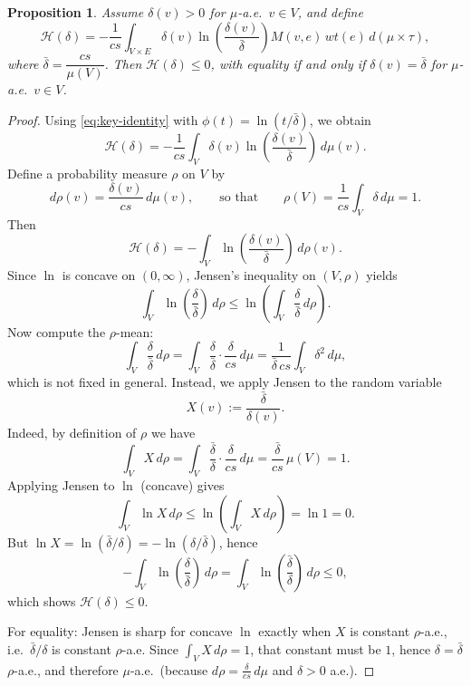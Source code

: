 \documentclass[10pt,a4paper]{amsart}
\newtheorem{prop}{Proposition}
\begin{document}
\begin{prop}
\label{cor:entropy-proof}
Assume $\delta(v)>0$ for $\mu$-a.e.\ $v\in V$, and define
\[
\mathcal{H}(\delta)
=
-\frac{1}{cs}
\int_{V\times E}
\delta(v)\ln\!\left(\frac{\delta(v)}{\bar\delta}\right)
M(v,e)\,wt(e)\,d(\mu\times\tau),
\]
where $\bar\delta=\dfrac{cs}{\mu(V)}$.
Then $\mathcal{H}(\delta)\le 0$, with equality if and only if
$\delta(v)=\bar\delta$ for $\mu$-a.e.\ $v\in V$.
\end{prop}

\begin{proof}
Using \eqref{eq:key-identity} with $\phi(t)=\ln(t/\bar\delta)$, we obtain
\[
\mathcal{H}(\delta)
=
-\frac{1}{cs}\int_V \delta(v)\ln\!\left(\frac{\delta(v)}{\bar\delta}\right)\,d\mu(v).
\]
Define a probability measure $\rho$ on $V$ by
\[
d\rho(v)=\frac{\delta(v)}{cs}\,d\mu(v),
\qquad\text{so that}\qquad
\rho(V)=\frac{1}{cs}\int_V \delta\,d\mu=1.
\]
Then
\[
\mathcal{H}(\delta)
=
-\int_V \ln\!\left(\frac{\delta(v)}{\bar\delta}\right)\,d\rho(v).
\]
Since $\ln$ is concave on $(0,\infty)$, Jensen's inequality on $(V,\rho)$ yields
\[
\int_V \ln\!\left(\frac{\delta}{\bar\delta}\right)\,d\rho
\le
\ln\!\left(\int_V \frac{\delta}{\bar\delta}\,d\rho\right).
\]
Now compute the $\rho$-mean:
\[
\int_V \frac{\delta}{\bar\delta}\,d\rho
=
\int_V \frac{\delta}{\bar\delta}\cdot\frac{\delta}{cs}\,d\mu
=
\frac{1}{\bar\delta\,cs}\int_V \delta^2\,d\mu,
\]
which is not fixed in general.  Instead, we apply Jensen to the random variable
\[
X(v):=\frac{\bar\delta}{\delta(v)}.
\]
Indeed, by definition of $\rho$ we have
\[
\int_V X\,d\rho
=
\int_V \frac{\bar\delta}{\delta}\cdot\frac{\delta}{cs}\,d\mu
=
\frac{\bar\delta}{cs}\,\mu(V)
=
1.
\]
Applying Jensen to $\ln$ (concave) gives
\[
\int_V \ln X\,d\rho
\le \ln\!\left(\int_V X\,d\rho\right)=\ln 1=0.
\]
But $\ln X=\ln(\bar\delta/\delta)=-\ln(\delta/\bar\delta)$, hence
\[
-\int_V \ln\!\left(\frac{\delta}{\bar\delta}\right)\,d\rho
=
\int_V \ln\!\left(\frac{\bar\delta}{\delta}\right)\,d\rho
\le 0,
\]
which shows $\mathcal{H}(\delta)\le 0$.

For equality: Jensen is sharp for concave $\ln$ exactly when $X$ is constant
$\rho$-a.e., i.e.\ $\bar\delta/\delta$ is constant $\rho$-a.e. Since
$\int_V X\,d\rho=1$, that constant must be $1$, hence $\delta=\bar\delta$
$\rho$-a.e., and therefore $\mu$-a.e.\ (because $d\rho=\frac{\delta}{cs}\,d\mu$
and $\delta>0$ a.e.).
\end{proof}
\end{document}
